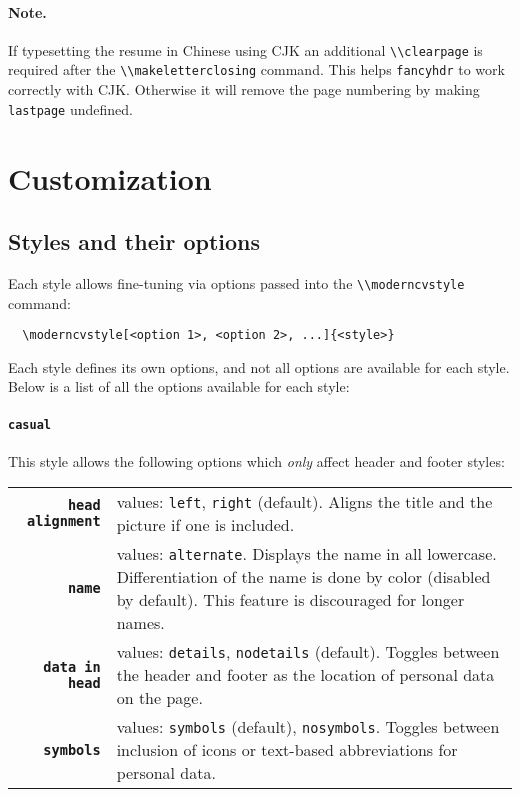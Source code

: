 \documentclass[a4paper, 11pt]{article}
\newcommand{\note}{\paragraph{Note.}}
\newcommand{\code}[1]{\lstinline!#1!}
\begin{document}
\note If typesetting the resume in Chinese using CJK an additional \code{\\clearpage} is required after the \code{\\makeletterclosing} command. This helps \code{fancyhdr} to work correctly with CJK. Otherwise it will remove the page numbering by making \code{lastpage} undefined.

\section{Customization}
\label{section:customization}
\subsection{Styles and their options}
\label{section:customization:stylesAndOptions}
Each style allows fine-tuning via options passed into the \code{\\moderncvstyle} command:
\begin{lstlisting}
  \moderncvstyle[<option 1>, <option 2>, ...]{<style>}
\end{lstlisting}
Each style defines its own options, and not all options are available for each style.
Below is a list of all the options available for each style:

\paragraph{\code{casual}}
This style allows the following options which \emph{only} affect header and footer styles:

\begin{tabular}{r@{\hspace{2ex}}p{}}
  \textbf{\code{head alignment}} & values: \code{left}, \code{right} (default).
  Aligns the title and the picture if one is included. \\
  \textbf{\code{name}}           & values: \code{alternate}.
  Displays the name in all lowercase.
  Differentiation of the name is done by color (disabled by default).
  This feature is discouraged for longer names. \\
  \textbf{\code{data in head}}   & values: \code{details}, \code{nodetails} (default).
  Toggles between the header and footer as the location of personal data on the page. \\
  \textbf{\code{symbols}}        & values: \code{symbols} (default), \code{nosymbols}.
  Toggles between inclusion of icons or text-based abbreviations for personal data.
\end{tabular}
\end{document}
